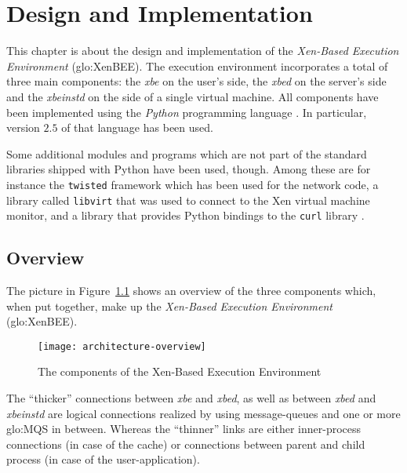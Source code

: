 
\chapter{Design and Implementation}
\label{cha:design}

This chapter is about the design and implementation of the \emph{Xen-Based
  Execution  Environment} (\gls{glo:XenBEE}).   The  execution environment
incorporates  a total  of three  main  components: the  \emph{xbe} on  the
user's side, the \emph{xbed} on  the server's side and the \emph{xbeinstd}
on  the  side of  a  single virtual  machine.   All  components have  been
implemented     using    the     \emph{Python}     programming    language
\cite{python-language}. In particular, version  $2.5$ of that language has
been used.

Some additional  modules and programs which  are not part  of the standard
libraries shipped with Python have  been used, though. Among these are for
instance  the \texttt{twisted}  framework \cite{twisted-python}  which has
been  used  for  the  network  code,  a  library  called  \texttt{libvirt}
\cite{libvirt}  that  was used  to  connect  to  the Xen  virtual  machine
monitor, and a library that  provides Python bindings to the \texttt{curl}
library \cite{pycurl}.


\section{Overview}
\label{sec:design:overview}

The picture in Figure~\ref{fig:architecture-overview} shows an overview of
the three components which, when put together, make up the \emph{Xen-Based
  Execution  Environment} (\gls{glo:XenBEE}).

\begin{figure}[ht]
  \centering
  \texttt{[image: architecture-overview]}
  \caption[Overview of the  \gls{glo:XenBEE} components]{The components of
    the Xen-Based Execution Environment}
  \label{fig:architecture-overview}
\end{figure}

The ``thicker'' connections between \emph{xbe} and \emph{xbed}, as well as
between \emph{xbed}  and \emph{xbeinstd} are  logical connections realized
by using message-queues and one or more \gls{glo:MQS} in between.  Whereas
the ``thinner'' links are either inner-process connections (in case of the
cache) or  connections between  parent and child  process (in case  of the
user-application).

